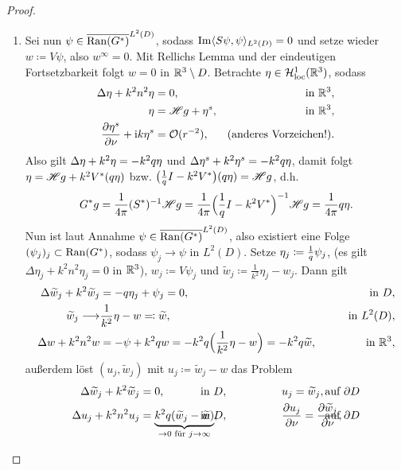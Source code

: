 \begin{proof}
\begin{enumerate}[label=(\alph*)]
	
		\item Sei nun \(\psi\in\overline{\operatorname{Ran}(G^\ast)}^{L^2(D)}\), sodass \(\operatorname{Im}\langle S\psi,\psi\rangle_{L^2(D)}=0\) und setze wieder \(w\coloneqq V\psi\), also \(w^\infty=0\). Mit Rellichs Lemma und der eindeutigen Fortsetzbarkeit folgt \(w=0\) in \(\mathbb{R}^3\setminus D\). Betrachte \(\eta\in\mathcal{H}_{\mathrm{loc}}^1(\mathbb{R}^3)\), sodass
		\begin{align*}
				\Delta \eta+k^2n^2\eta&=0,&\text{in }\mathbb{R}^3,\\
				\eta&=\mathscr{H} g+\eta^s,&\text{in }\mathbb{R}^3,\\
				\frac{\partial \eta^s}{\partial\nu}+\mathrm{i} k\eta^s&=\mathcal{O}(r^{-2}),&\text{(anderes Vorzeichen!).}
		\end{align*}
		Also gilt \(\Delta \eta+k^2\eta=-k^2q \eta\) und \(\Delta \eta^s+k^2\eta^s=-k^2q \eta\), damit folgt \(\eta=\mathscr{H} g+k^2V^\ast(q \eta)\) bzw. \(\big(\frac{1}{q}I-k^2V^\ast\big)(q \eta)=\mathscr{H} g\), d.h.
		\begin{equation*}
			G^\ast g=\frac{1}{4\pi}(S^\ast)^{-1}\mathscr{H} g=\frac{1}{4\pi}\Big(\frac{1}{q}I-k^2V^\ast\Big)^{-1}\mathscr{H} g=\frac{1}{4\pi}q \eta.
		\end{equation*}
		Nun ist laut Annahme \(\psi\in\overline{\operatorname{Ran}(G^\ast)}^{L^2(D)}\), also existiert eine Folge \((\psi_j)_j\subset\operatorname{Ran}(G^\ast)\), sodass \(\psi_j\to\psi\) in \(L^2(D)\). Setze \(\eta_j\coloneqq\frac{1}{q}\psi_j\), (es gilt \(\Delta \eta_j+k^2n^2\eta_j=0\) in \(\mathbb{R}^3\)), \(w_j\coloneqq V\psi_j\) und \(\widetilde{w}_j\coloneqq \frac{1}{k^2}\eta_j-w_j\). Dann gilt
		\begin{align*}
			\Delta\widetilde{w}_j+k^2\widetilde{w}_j & = -q \eta_j+\psi_j = 0,&\qquad\text{in }D,\\
			\widetilde{w}_j\longrightarrow&\frac{1}{k^2} \eta-w\eqqcolon\widetilde{w},&\qquad\text{in }L^2(D),\\
			\Delta w+k^2n^2w & =-\psi+k^2q w = -k^2q\Big(\frac{1}{k^2}\eta-w\Big) = -k^2q\widetilde{w},&\qquad\text{in }\mathbb{R}^3,
		\end{align*}
		außerdem löst \((u_j,\widetilde{w}_j)\) mit \(u_j \coloneqq\widetilde{w}_j-w\) das Problem
		\begin{align*}
			\Delta \widetilde{w}_j +k^2\widetilde{w}_j &=0,&\hspace{-1cm}\te{ in }D, \qquad\qquad\quad & u_j=\widetilde{w}_j,&\hspace{-1cm}\te{ auf }\p D\\
			\Delta u_j+k^2n^2u_j & =\underbrace{k^2\kontrast(\widetilde{w}_j-\widetilde{w})}_{\to0\te{ für }j\to\infty}, & \hspace{-1cm}\te{ in }D, \qquad\qquad\quad  & \frac{\p u_j}{\p\normal} =\frac{\p\widetilde{w}_j}{\p\normal},&\hspace{-1cm}\te{ auf }\p D
		\end{align*}

\end{enumerate}
\end{proof}
